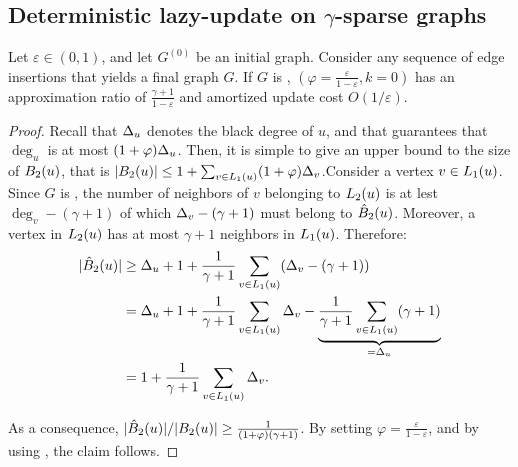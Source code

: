 \subsection{Deterministic lazy-update on \texorpdfstring{$\gamma$}{gamma}-sparse graphs}\label{apx:gamma-ok-deterministic}

\begin{theorem}\label{lemma:gamma-ok-error-bound-balls}
    
Let $\varepsilon \in (0,1)$, and let $G^{(0)}$ be an initial graph. Consider any sequence of edge insertions that yields a final graph $G$. If $G$ is \gammaok, \lazyscheme$(\varphi = \frac{\varepsilon}{1 - \varepsilon},k=0)$ has an approximation ratio of  $\frac{\gamma + 1}{1-\varepsilon}$ and amortized update cost $O(1/\varepsilon)$. 
    
\end{theorem}
\begin{proof}
Recall that $\Delta_u$ denotes the black degree of $u$, and that   guarantees that $\deg_u$ is at most $(1+\varphi)\Delta_u$.
    Then, it is simple to give an upper bound to the size of $B_2(u)$, that is $\vert B_2(u) \vert \leq 1+ \sum_{v \in L_1(u)} (1 + \varphi)\Delta_v$.Consider a vertex $v \in L_1(u)$. Since $G$ is \gammaok, the number of neighbors of $v$ belonging to $L_2(u)$ is at lest $\deg_v - (\gamma+1)$ of which $\Delta_v - (\gamma+1)$ must belong to $\hat{B}_2(u)$. Moreover, a vertex in $L_2(u)$ has at most $\gamma+1$ neighbors in $L_1(u)$. Therefore: 
    \begin{align*}
    \vert \hat{B}_2(u) \vert
    &\geq  \Delta_u + 1 + \frac{1}{\gamma + 1}\sum_{v \in L_1(u)}(\Delta_v - (\gamma + 1))\\
    &= \Delta_u + 1 + \frac{1}{\gamma + 1}\sum_{v \in L_1(u)}\Delta_v - \underbrace{\frac{1}{\gamma + 1}\sum_{v \in L_1(u)}(\gamma + 1)}_{= \Delta_u}\\
    &= 1+ \frac{1}{\gamma + 1}\sum_{v \in L_1(u)}\Delta_v.
    \end{align*}
  
    As a consequence, $\vert \hat{B}_2(u) \vert/\vert B_2(u) \vert \ge \frac{1}{(1+\varphi)(\gamma+1)}$. By setting $\varphi = \frac{\varepsilon}{1 - \varepsilon}$, and by using ,  the claim follows.
\end{proof}

